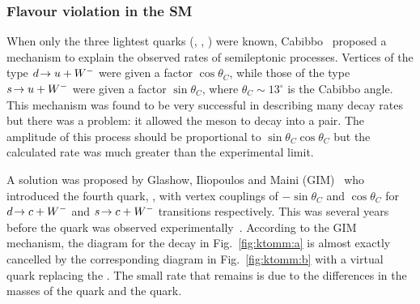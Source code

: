 \subsubsection{Flavour violation in the SM}

When only the three lightest quarks (\uquark, \dquark, \squark) were known, Cabibbo~\cite{cabbibo} proposed a mechanism to explain the observed rates of semileptonic processes. Vertices of the type ${d}\!\rightarrow {\ensuremath{u}}+{W^-}$ were given a factor $\cos\theta_{C}$, while those of the type ${s}\!\rightarrow {\ensuremath{u}}+{W^-}$ were given a factor $\sin\theta_{C}$, where $\theta_{C}\sim13^{\circ}$ is the Cabibbo angle. This mechanism was found to be very successful in describing many decay rates but there was a problem: it allowed the \Kz meson to decay into a \mumu pair. The amplitude of this process should be proportional to $\sin\theta_{C}\cos\theta_{C}$ but the calculated rate was much greater than the experimental limit. 

A solution was proposed by Glashow, Iliopoulos and Maini (GIM)~\cite{gim} who introduced the fourth quark, \cquark, with vertex couplings of $-\sin\theta_{C}$ and $\cos\theta_{C}$ for ${d}\!\rightarrow {\ensuremath{c}}+{W^-}$ and ${s}\!\rightarrow {\ensuremath{c}}+{W^-}$ transitions respectively. This was several years before the \cquark quark was observed experimentally~\cite{jpsi-1,jpsi-2}. According to the GIM mechanism, the diagram for the decay \decay{\Kz}{\mumu} in Fig.~\ref{fig:ktomm:a} is almost exactly cancelled by the corresponding diagram in Fig.~\ref{fig:ktomm:b} with a virtual \cquark quark replacing the \uquark. The small rate that remains is due to the differences in the masses of the \uquark quark and the \cquark quark.

